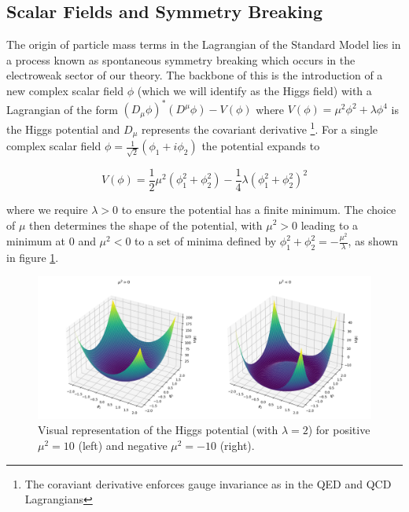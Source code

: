 \subsection{Scalar Fields and Symmetry Breaking}

The origin of particle mass terms in the Lagrangian of the Standard Model lies in a process known as spontaneous 
symmetry breaking \cite{higgs-broken-symmetries, englert-broken-symmetries} which occurs in the electroweak 
sector of our theory. The backbone of this is the introduction of a new complex scalar field $\phi$ (which we will 
identify as the Higgs field) with a Lagrangian of the form $(D_{\mu}\phi)^*(D^{\mu}\phi) - V(\phi)$ where 
$V(\phi) = \mu^2\phi^2 + \lambda\phi^4$ is the Higgs potential and $D_{\mu}$ represents the covariant 
derivative \footnote{The coraviant derivative enforces gauge invariance as in the QED and QCD Lagrangians}. For 
a single complex scalar field $\phi = \frac{1}{\sqrt{2}}(\phi_1 + i\phi_2)$ the potential expands to

\begin{equation}
V(\phi) = \frac{1}{2}\mu^2(\phi_1^2 + \phi_2^2) - \frac{1}{4}\lambda(\phi_1^2 + \phi_2^2)^2
\end{equation}

where we require $\lambda > 0$ to ensure the potential has a finite minimum. The choice of $\mu$ then determines 
the shape of the potential, with $\mu^2 > 0$ leading to a minimum at 0 and $\mu^2 < 0$ to a set of minima defined 
by $\phi_1^2 + \phi_2^2 = -\frac{\mu^2}{\lambda}$, as shown in figure \ref{fig:Higgs_Potential}. 

\begin{figure}
\centering
    \includegraphics[width=1.0\textwidth]{images/Higgs_Potential.png}
    \caption{Visual representation of the Higgs potential (with $\lambda = 2$) for positive $\mu^2 = 10$ (left) and 
    negative $\mu^2 = -10$ (right).}
    \label{fig:Higgs_Potential}
\end{figure}

